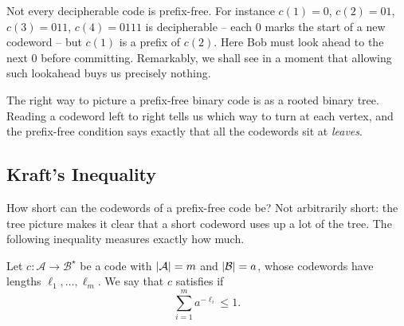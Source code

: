 \documentclass[a4paper]{scrartcl}
\newcommand{\Ac}{\mathcal{A}}
\newcommand{\Bc}{\mathcal{B}}
\begin{document}
Not every decipherable code is prefix-free. For instance $c(1) = 0$, $c(2) = 01$, $c(3) = 011$, $c(4) = 0111$ is decipherable -- each $0$ marks the start of a new codeword -- but $c(1)$ is a prefix of $c(2)$. Here Bob must look ahead to the next $0$ before committing. Remarkably, we shall see in a moment that allowing such lookahead buys us precisely nothing.

The right way to picture a prefix-free binary code is as a rooted binary tree. Reading a codeword left to right tells us which way to turn at each vertex, and the prefix-free condition says exactly that all the codewords sit at \emph{leaves}.

\begin{center}
\end{center}

\subsection{Kraft's Inequality}

How short can the codewords of a prefix-free code be? Not arbitrarily short: the tree picture makes it clear that a short codeword uses up a lot of the tree. The following inequality measures exactly how much.

\begin{definition}
	Let $c \colon \Ac \to \Bc^\star$ be a code with $\abs{\Ac} = m$ and $\abs{\Bc} = a$, whose codewords have lengths $\ell_1, \dots, \ell_m$. We say that $c$ satisfies  if
	$$\sum_{i=1}^m a^{-\ell_i} \le 1.$$
\end{definition}
\end{document}
